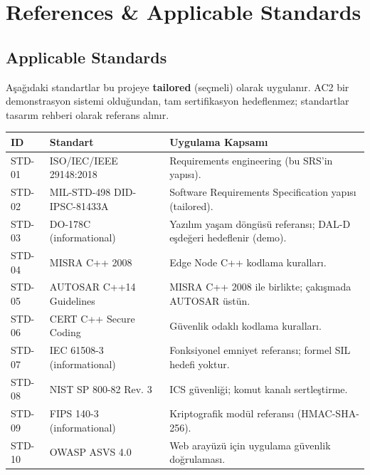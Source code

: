 \section{References \& Applicable Standards}

\subsection{Applicable Standards}
Aşağıdaki standartlar bu projeye \textbf{tailored} (seçmeli) olarak uygulanır. AC2 bir demonstrasyon sistemi olduğundan, tam sertifikasyon hedeflenmez; standartlar tasarım rehberi olarak referans alınır.

\begin{tabularx}{\textwidth}{|l|l|X|}
\hline
\textbf{ID} & \textbf{Standart} & \textbf{Uygulama Kapsamı} \\
\hline
STD-01 & ISO/IEC/IEEE 29148:2018 & Requirements engineering (bu SRS'in yapısı). \\
\hline
STD-02 & MIL-STD-498 DID-IPSC-81433A & Software Requirements Specification yapısı (tailored). \\
\hline
STD-03 & DO-178C (informational) & Yazılım yaşam döngüsü referansı; DAL-D eşdeğeri hedeflenir (demo). \\
\hline
STD-04 & MISRA C++ 2008 & Edge Node C++ kodlama kuralları. \\
\hline
STD-05 & AUTOSAR C++14 Guidelines & MISRA C++ 2008 ile birlikte; çakışmada AUTOSAR üstün. \\
\hline
STD-06 & CERT C++ Secure Coding & Güvenlik odaklı kodlama kuralları. \\
\hline
STD-07 & IEC 61508-3 (informational) & Fonksiyonel emniyet referansı; formel SIL hedefi yoktur. \\
\hline
STD-08 & NIST SP 800-82 Rev. 3 & ICS güvenliği; komut kanalı sertleştirme. \\
\hline
STD-09 & FIPS 140-3 (informational) & Kriptografik modül referansı (HMAC-SHA-256). \\
\hline
STD-10 & OWASP ASVS 4.0 & Web arayüzü için uygulama güvenlik doğrulaması. \\
\hline
\end{tabularx}

